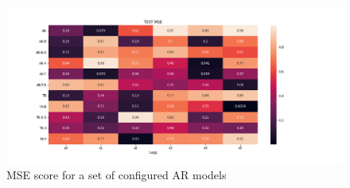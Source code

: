\begin{table}[h]
    \centering
    \caption{Configuration of \acrshort{ar}-models. $\times$ denoted not applied, \checked denotes applied. \textbf{Bruk denne for tre eksempler.}}
    \label{tab:ar_model_config}
\end{table}

\begin{figure}
    \centering
    \includegraphics[scale = 0.5]{python_figs/MSE_score_AR_models.png}
    \caption{MSE score for a set of configured AR models}
    \label{fig:results_ar_models}
\end{figure}



